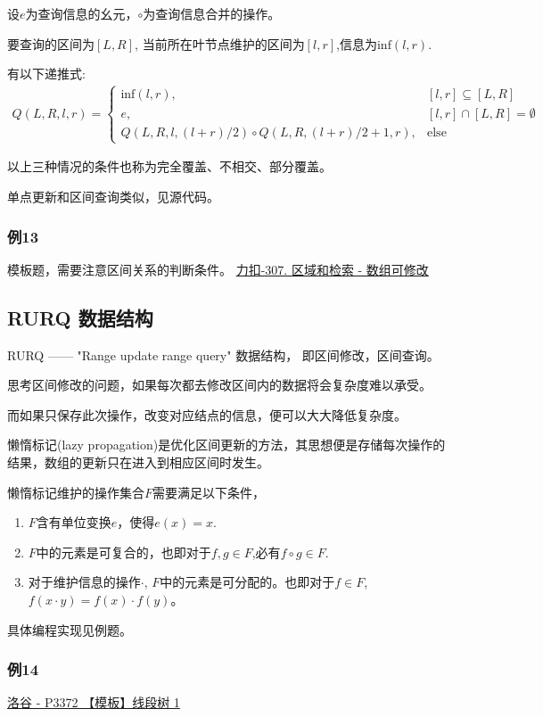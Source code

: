 \documentclass{article}
\newcommand{\Inf}{\text{inf}}
\newcommand{\Else}{\text{else}}
\newcommand{\inputcppfile}[1]{}
\begin{document}
设$e$为查询信息的幺元，$\circ$为查询信息合并的操作。

要查询的区间为$[L,R]$, 当前所在叶节点维护的区间为$[l,r]$,信息为$\Inf(l,r)$.

有以下递推式:
\begin{align*}
    Q(L,R,l,r) = \begin{cases}
        \Inf(l,r) , & [l,r] \subseteq [L,R] \\
        e, & [l,r] \cap [L,R] = \emptyset \\
        Q(L,R,l,(l+r)/2) \circ Q(L,R,(l+r)/2+1,r), & \Else 
    \end{cases}  
\end{align*}

以上三种情况的条件也称为完全覆盖、不相交、部分覆盖。

单点更新和区间查询类似，见源代码。

\subsubsection{例13}
模板题，需要注意区间关系的判断条件。
\href{https://leetcode.cn/problems/range-sum-query-mutable/description/}{力扣-307. 区域和检索 - 数组可修改}
\inputcppfile{Code_13.cpp}

\subsection{RURQ 数据结构}
RURQ —— "Range update range query" 数据结构， 即区间修改，区间查询。

思考区间修改的问题，如果每次都去修改区间内的数据将会复杂度难以承受。

而如果只保存此次操作，改变对应结点的信息，便可以大大降低复杂度。

懒惰标记(lazy propagation)是优化区间更新的方法，其思想便是存储每次操作的结果，数组的更新只在进入到相应区间时发生。

懒惰标记维护的操作集合$F$需要满足以下条件，
\begin{enumerate}
    \item $F$含有单位变换$e$，使得$e(x) = x$.
    \item $F$中的元素是可复合的，也即对于$f,g\in F$,必有$f \circ g  \in F$.
    \item 对于维护信息的操作$\cdot$, $F$中的元素是可分配的。也即对于$f \in F$, $f(x\cdot y) = f(x)\cdot f(y)$。
\end{enumerate}

具体编程实现见例题。

\subsubsection{例14}
\href{https://www.luogu.com.cn/problem/P3372}{洛谷 - P3372 【模板】线段树 1}
\end{document}
